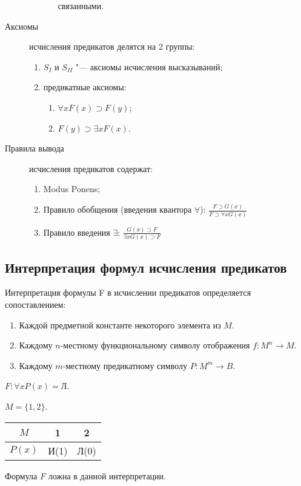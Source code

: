 \begin{description}
\begin{enumerate}
\begin{itemize}
\begin{rem}
связанными.
        \end{rem}
      \end{itemize}
    \end{enumerate}
  \item[Аксиомы] исчисления предикатов делятся на 2 группы:
    \begin{enumerate}
    \item $S_I$ и $S_{II}$ "--- аксиомы исчисления высказываний;
    \item предикатные аксиомы:
      \begin{enumerate}
      \item $\forall x F(x) \supset F(y)$;
      \item $F(y) \supset \exists x F(x)$.
      \end{enumerate}
    \end{enumerate}
  \item[Правила вывода] исчисления предикатов содержат:
    \begin{enumerate}
    \item Modus Ponens;
    \item Правило обобщения (введения квантора $\forall$): $\frac{F
\supset G(x)}{F \supset \forall x G(x)}$
    \item Правило введения $\exists$: $\frac{G(x) \supset F}{\exists x
G(x) \supset F}$
    \end{enumerate}
\end{description}

\subsection{Интерпретация формул исчисления предикатов}

Интерпретация формулы F в исчислении предикатов определяется
сопоставлением:
\begin{enumerate}
\item Каждой предметной константе некоторого элемента из $M$.
\item Каждому $n$-местному функциональному символу отображения
$f\colon M^n \rightarrow M$.
\item Каждому $m$-местному предикатному символу $P\colon M^m
\rightarrow B$.
\end{enumerate}

\begin{ex} $F\colon \forall x P(x) = Л$.

  $M = \{1,2\}$.

  \begin{center}
    \begin{tabular}{c||c|c|} $M$ & 1 & 2\\ \hline\hline $P(x)$ & И(1)
& Л(0)\\
    \end{tabular}
  \end{center}

  Формула $F$ ложна в данной интерпретации.
\end{ex}

